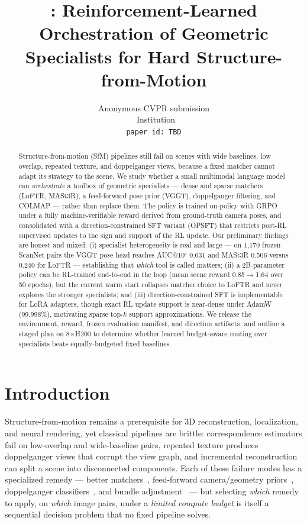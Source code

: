 \documentclass[10pt,twocolumn,letterpaper]{article}
\title{\method{}: Reinforcement-Learned Orchestration of Geometric
Specialists for Hard Structure-from-Motion}
\author{Anonymous CVPR submission\\
\ Institution\\
{\tt\small paper id: TBD}
}
\begin{document}
\maketitle

\begin{abstract}
Structure-from-motion (SfM) pipelines still fail on scenes with wide
baselines, low overlap, repeated texture, and doppelganger views, because
a fixed matcher cannot adapt its strategy to the scene. We study whether
a small multimodal language model can \emph{orchestrate} a toolbox of
geometric specialists — dense and sparse matchers (LoFTR, MASt3R), a
feed-forward pose prior (VGGT), doppelganger filtering, and COLMAP —
rather than replace them. The policy is trained on-policy with GRPO under
a fully machine-verifiable reward derived from ground-truth camera poses,
and consolidated with a direction-constrained SFT variant (OPSFT) that
restricts post-RL supervised updates to the sign and support of the RL
update. Our preliminary findings are honest and mixed: (i) specialist
heterogeneity is real and large — on 1,170 frozen ScanNet pairs the VGGT
pose head reaches AUC@10$^\circ$ 0.631 and MASt3R 0.506 versus 0.240 for
LoFTR — establishing that \emph{which} tool is called matters;
(ii) a 2B-parameter policy can be RL-trained end-to-end in the loop
(mean scene reward 0.85$\to$1.64 over 50 epochs), but the current warm
start collapses matcher choice to LoFTR and never explores the stronger
specialists; and (iii) direction-constrained SFT is implementable for
LoRA adapters, though exact RL update support is near-dense under AdamW
(99.998\%), motivating sparse top-$k$ support approximations. We release
the environment, reward, frozen evaluation manifest, and direction
artifacts, and outline a staged plan on 8$\times$H200 to determine whether
learned budget-aware routing over specialists beats equally-budgeted fixed
baselines.
\end{abstract}

\section{Introduction}
\label{sec:intro}

Structure-from-motion remains a prerequisite for 3D reconstruction,
localization, and neural rendering, yet classical pipelines are brittle:
correspondence estimators fail on low-overlap and wide-baseline pairs,
repeated texture produces doppelganger views that corrupt the view graph,
and incremental reconstruction can split a scene into disconnected
components. Each of these failure modes has a specialized remedy —
better matchers~\cite{loftr,mast3r}, feed-forward camera/geometry
priors~\cite{vggt}, doppelganger classifiers~\cite{doppelgangerspp}, and
bundle adjustment~\cite{colmap} — but selecting \emph{which} remedy to
apply, on \emph{which} image pairs, under a \emph{limited compute budget}
is itself a sequential decision problem that no fixed pipeline solves.
\end{document}
